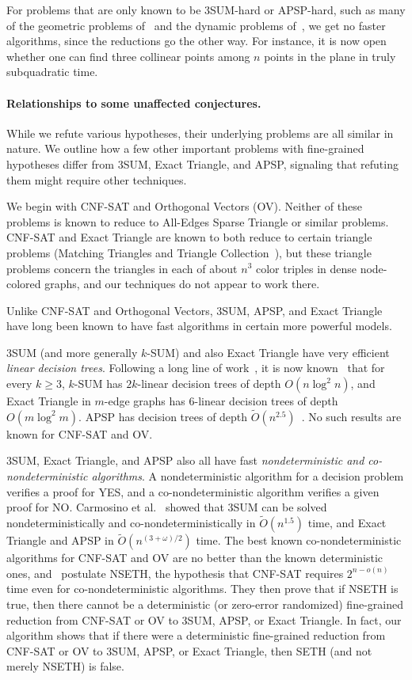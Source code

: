 For problems that are only known to be 3SUM-hard or APSP-hard, such as many of the geometric problems of~\cite{GO95} and the dynamic problems of~\cite{Pat10,AV14,KPP16}, we get no faster algorithms, since the reductions go the other way. For instance, it is now open whether one can find three collinear points among $n$ points in the plane in truly subquadratic time.




\paragraph{Relationships to some unaffected conjectures.}
While we refute various hypotheses, their underlying problems are all similar in nature. We outline how a few other important problems with fine-grained hypotheses differ from $3$SUM, Exact Triangle, and APSP, signaling that refuting them might require other techniques.

We begin with CNF-SAT and Orthogonal Vectors (OV). Neither of these problems is known to reduce to All-Edges Sparse Triangle or similar problems. CNF-SAT and Exact Triangle are known to both reduce to certain triangle problems (Matching Triangles and Triangle Collection~\cite{AVY15}), but these triangle problems concern the triangles in each of about $n^3$ color triples in dense node-colored graphs, and our techniques do not appear to work there.

Unlike CNF-SAT and Orthogonal Vectors, $3$SUM, APSP, and Exact Triangle have long been known to have fast algorithms in certain more powerful models.

$3$SUM (and more generally $k$-SUM) and also Exact Triangle have very efficient {\em linear decision trees}. Following a long line of work~\cite{MadH84,Eri99,AC05,GS17,ES17,CIO16,GP18,KLM19}, it is now known~\cite{KLM19} that for every $k\geq 3$, $k$-SUM has $2k$-linear decision trees of depth $O(n\log^2 n)$, and Exact Triangle in $m$-edge graphs has $6$-linear decision trees of depth $O(m\log^2 m)$. APSP has decision trees of depth $\tilde O(n^{2.5})$~\cite{Fre76}.  No such results are known for CNF-SAT and OV.


$3$SUM, Exact Triangle, and APSP also all have fast
{\em nondeterministic and co-nondeterministic algorithms}.
A nondeterministic algorithm for a decision problem verifies a proof for YES, and a co-nondeterministic algorithm verifies a given proof for NO. Carmosino et al.~\cite{CGI+16}
showed that $3$SUM can be solved nondeterministically and co-nondeterministically in $\tilde O(n^{1.5})$ time, and Exact Triangle and APSP in $\tilde{O}(n^{(3+\omega)/2})$ time. The best known co-nondeterministic algorithms for CNF-SAT and OV are no better than the known deterministic ones, and~\cite{CGI+16} postulate NSETH, the hypothesis that CNF-SAT requires $2^{n-o(n)}$ time even for co-nondeterministic algorithms. They then prove that if NSETH is true, then there cannot be a deterministic (or zero-error randomized) fine-grained reduction from CNF-SAT or OV to $3$SUM, APSP, or Exact Triangle. In fact, our algorithm  shows that if there were a deterministic fine-grained reduction from CNF-SAT or OV to $3$SUM, APSP, or Exact Triangle, then SETH (and not merely NSETH) is false.

